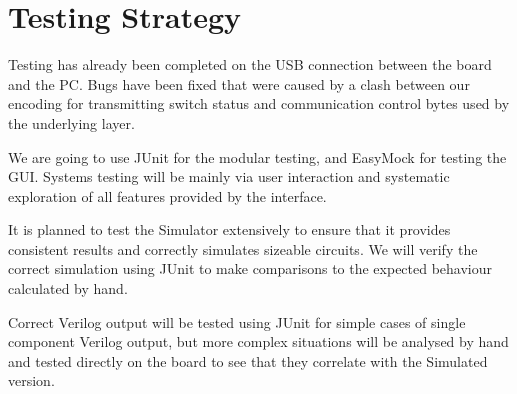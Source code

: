 \documentclass[12pt, a4paper, oneside,titlepage]{article}
\begin{document}
\section{Testing Strategy}
Testing has already been completed on the USB connection between the board and the PC. Bugs have been fixed that were caused by a clash between our encoding for transmitting switch status and communication control bytes used by the underlying layer. 

We are going to use JUnit for the modular testing, and EasyMock for testing the GUI. Systems testing will be mainly via user interaction and systematic exploration of all features provided by the interface. 

It is planned to test the Simulator extensively to ensure that it provides consistent results and correctly simulates sizeable circuits. We will verify the correct simulation using JUnit to make comparisons to the expected behaviour calculated by hand. 

Correct Verilog output will be tested using JUnit for simple cases of single component Verilog output, but more complex situations will be analysed by hand and tested directly on the board to see that they correlate with the Simulated version.
\end{document}
